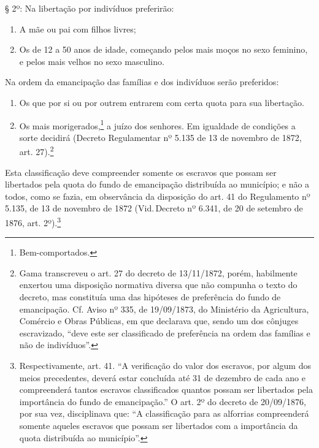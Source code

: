 § 2º: Na libertação por indivíduos preferirão:

\begin{enumerate}[label={\scshape\roman*.}]
\item A mãe ou pai com filhos livres;

\item Os de 12 a 50 anos de idade, começando pelos mais moços no sexo
feminino, e pelos mais velhos no sexo masculino.
\end{enumerate}

Na ordem da emancipação das famílias e dos indivíduos serão preferidos:

\begin{enumerate}[label=\arabic*º]
\item Os que por si ou por outrem entrarem com certa quota para sua
libertação.

\item Os mais morigerados,\footnote{Bem-comportados.} a juízo dos
senhores. Em igualdade de condições a sorte decidirá (Decreto
Regulamentar nº 5.135 de 13 de novembro de 1872, art. 27).\footnote{
  Gama transcreveu o art. 27 do decreto de 13/11/1872, porém, habilmente
  enxertou uma disposição normativa diversa que não compunha o texto do
  decreto, mas constituía uma das hipóteses de preferência do
  fundo de emancipação. Cf. Aviso nº 335, de 19/09/1873, do Ministério
  da Agricultura, Comércio e Obras Públicas, em que declarava que, sendo
  um dos cônjuges escravizado, ``deve este ser classificado de
  preferência na ordem das famílias e não de indivíduos''.}
\end{enumerate}  

Esta classificação deve compreender somente os escravos que possam ser
libertados pela quota do fundo de emancipação distribuída ao município;
e não a todos, como se fazia, em observância da disposição do art. 41 do
Regulamento nº 5.135, de 13 de novembro de 1872 (Vid.\,Decreto nº 6.341,
de 20 de setembro de 1876, art. 2º).\footnote{Respectivamente, art.
  41. ``A verificação do valor dos escravos, por algum dos meios
  precedentes, deverá estar concluída até 31 de dezembro de cada ano e
  compreenderá tantos escravos classificados quantos possam ser
  libertados pela importância do fundo de emancipação.'' O art. 2º do
  decreto de 20/09/1876, por sua vez, disciplinava que: ``A classificação
  para as alforrias compreenderá somente aqueles escravos que possam ser
  libertados com a importância da quota distribuída ao município''.}

